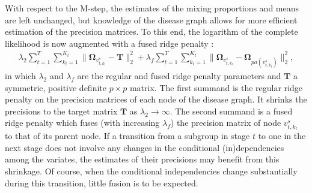 \documentclass[10pt]{article}
\begin{document}
With respect to the M-step, the estimates of the mixing proportions and means are left unchanged, but knowledge of the disease graph allows for more efficient estimation of the precision matrices. To this end, the logarithm of the complete likelihood is now augmented with a fused ridge penalty \citep{Bilg2015}:
\begin{eqnarray*}
\lambda_2 \sum_{t=1}^T\sum_{k_t=1}^{K_t} \| \mathbf{\Omega}_{v^s_{t, k_t}} - \mathbf{T} \|_2^2  + \lambda_f \sum_{t=1}^T \sum_{k_t=1}^{K_t} \| \mathbf{\Omega}_{v^s_{t, k_t}} - \mathbf{\Omega}_{pa(v^s_{t, k_t})} \|_2^2,
\end{eqnarray*}
in which $\lambda_2$ and $\lambda_f$ are the regular and fused ridge penalty parameters and $\mathbf{T}$ a symmetric, positive definite $p \times p$ matrix. The first summand is the regular ridge penalty on the precision matrices of each node of the disease graph. It shrinks the precisions to the target matrix $\mathbf{T}$ as $\lambda_2 \rightarrow \infty$. The second summand is a fused ridge penalty which fuses (with increasing $\lambda_f$) the precision matrix of node $v^s_{t, k_t}$ to that of its parent node. If a transition from a subgroup in stage $t$ to one in the next stage does not involve any changes in the conditional (in)dependencies among the variates, the estimates of their precisions may benefit from this shrinkage. Of course, when the conditional independencies change substantially during this transition, little fusion is to be expected.
\end{document}
